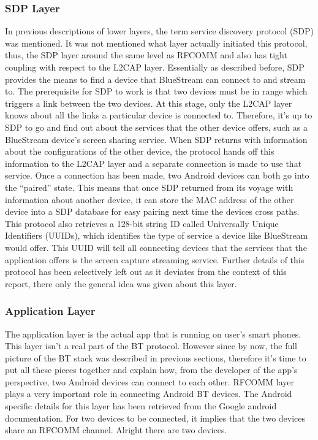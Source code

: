 \documentclass[a4paper,12pt]{article}
\begin{document}
\subsubsection{SDP Layer}
In previous descriptions of lower layers, the term service discovery protocol (SDP) was mentioned. It was not mentioned what layer actually initiated this protocol, thus, the SDP layer around the same level as RFCOMM and also has tight coupling with respect to the L2CAP layer. Essentially as described before, SDP provides the means to find a device that BlueStream can connect to and stream to. The prerequisite for SDP to work is that two devices must be in range which triggers a link between the two devices. At this stage, only the L2CAP layer knows about all the links a particular device is connected to. Therefore, it’s up to SDP to go and find out about the services that the other device offers, such as a BlueStream device’s screen sharing service. When SDP returns with information about the configurations of the other device, the protocol hands off this information to the L2CAP layer and a separate connection is made to use that service. Once a connection has been made, two Android devices can both go into the “paired” state. This means that once SDP returned from its voyage with information about another device, it can store the MAC address of the other device into a SDP database for easy pairing next time the devices cross paths. This protocol also retrieves a 128-bit string ID called Universally Unique Identifiers (UUIDs), which identifies the type of service a device like BlueStream would offer. This UUID will tell all connecting devices that the services that the application offers is the screen capture streaming service. Further details of this protocol has been selectively left out as it deviates from the context of this report, there only the general idea was given about this layer. 

\subsubsection{Application Layer}
The application layer is the actual app that is running on user’s smart phones. This layer isn’t a real part of the BT protocol. However since by now, the full picture of the BT stack was described in previous sections, therefore it's time to put all these pieces together and explain how, from the developer of the app’s perspective, two Android devices can connect to each other. RFCOMM layer plays a very important role in connecting Android BT devices. The Android specific details for this layer has been retrieved from the Google android documentation\cite{DevelopersAndroid}. For two devices to be connected, it implies that the two devices share an RFCOMM channel. Alright there are two devices.
\end{document}

